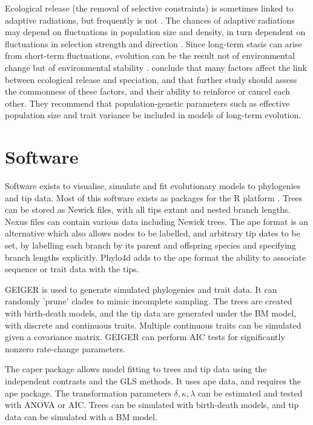 \documentclass[12pt]{article}
\begin{document}
Ecological release (the removal of selective constraints) is sometimes linked to adaptive radiations, but frequently is not \citep{yoder_ecological_2010}. The chances of adaptive radiations may depend on fluctuations in population size and density, in turn dependent on fluctuations in selection strength and direction \citep{siepielski_its_2009,futuyma_evolutionary_2010}. Since long-term stasis can arise from short-term fluctuations, evolution can be the result not of environmental change but of environmental stability \citep{futuyma_evolutionary_2010}. \citet{yoder_ecological_2010} conclude that many factors affect the link between ecological release and speciation, and that further study should assess the commonness of these factors, and their ability to reinforce or cancel each other. They recommend that population-genetic parameters such as effective population size and trait variance be included in models of long-term evolution.


\section{Software}

Software exists to visualise, simulate and fit evolutionary models to phylogenies and tip data. Most of this software exists as packages for the R platform \citep{team_r:_2005}. Trees can be stored as Newick files, with all tips extant and nested branch lengths. Nexus files can contain various data including Newick trees. The ape format \citep{paradis_ape:_2004}  is an alternative which also allows nodes to be labelled, and arbitrary tip dates to be set, by labelling each branch by its parent and offspring species and specifying branch lengths explicitly. Phylo4d \citep{hackathon_phylobase:_2011} adds to the ape format the ability to associate sequence or trait data with the tips.

GEIGER \citep{harmon_geiger:_2008} is used to generate simulated phylogenies and trait data. It can randomly 'prune' clades to mimic incomplete sampling. The trees are created with birth-death models, and the tip data are generated under the BM model, with discrete and continuous traits. Multiple continuous traits can be simulated given a covariance matrix. GEIGER can perform AIC tests for significantly nonzero rate-change parameters.

The caper package \cite{caper} allows model fitting to trees and tip data using the independent contrasts and the GLS methods. It uses ape data, and requires the ape package. The transformation parameters $\delta, \kappa, \lambda$ can be estimated and tested with ANOVA or AIC. Trees can be simulated with birth-death models, and tip data can be simulated with a BM model.
\end{document}
